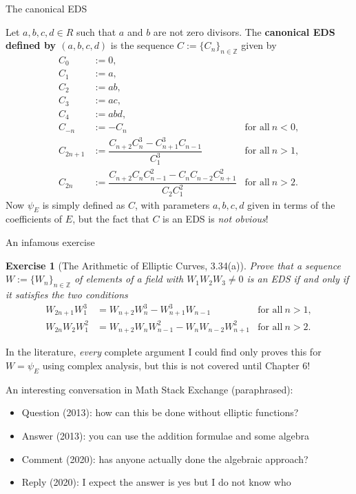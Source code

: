 \documentclass[10pt]{beamer}
\newtheorem{exercise}{Exercise}
\begin{document}
\begin{frame}[t]{The canonical EDS}

Let $ a, b, c, d \in R $ such that $ a $ and $ b $ are not zero divisors. The \textbf{canonical EDS defined by $ (a, b, c, d) $} is the sequence $ C := \{C_n\}_{n \in \mathbb{Z}} $ given by
\begin{align*}
C_0 & := 0, \\
C_1 & := a, \\
C_2 & := ab, \\
C_3 & := ac, \\
C_4 & := abd, \\
C_{-n} & := -C_n & \text{for all} \ n < 0, \\
C_{2n + 1} & := \dfrac{C_{n + 2}C_n^3 - C_{n + 1}^3C_{n - 1}}{C_1^3} & \text{for all} \ n > 1, \\
C_{2n} & := \dfrac{C_{n + 2}C_nC_{n - 1}^2 - C_nC_{n - 2}C_{n + 1}^2}{C_2C_1^2} & \text{for all} \ n > 2.
\end{align*}
Now $ \psi_E $ is simply defined as $ C $, with parameters $ a, b, c, d $ given in terms of the coefficients of $ E $, but the fact that $ C $ is an EDS is \emph{not obvious}!

\end{frame}

\begin{frame}[t]{An infamous exercise}

\begin{exercise}[The Arithmetic of Elliptic Curves, 3.34(a)]
Prove that a sequence $ W := \{W_n\}_{n \in \mathbb{Z}} $ of elements of a field with $ W_1W_2W_3 \ne 0 $ is an EDS if and only if it satisfies the two conditions
\begin{align*}
W_{2n + 1}W_1^3 & = W_{n + 2}W_n^3 - W_{n + 1}^3W_{n - 1} & \text{for all} \ n > 1, \\
W_{2n}W_2W_1^2 & = W_{n + 2}W_nW_{n - 1}^2 - W_nW_{n - 2}W_{n + 1}^2 & \text{for all} \ n > 2.
\end{align*}
\end{exercise}

In the literature, \emph{every} complete argument I could find only proves this for $ W = \psi_E $ using complex analysis, but this is not covered until Chapter 6!

\vspace{0.5cm} An interesting conversation in Math Stack Exchange (paraphrased):

\begin{itemize}
\item Question (2013): how can this be done without elliptic functions?
\item Answer (2013): you can use the addition formulae and some algebra
\item Comment (2020): has anyone actually done the algebraic approach?
\item Reply (2020): I expect the answer is yes but I do not know who
\end{itemize}

\end{frame}
\end{document}
